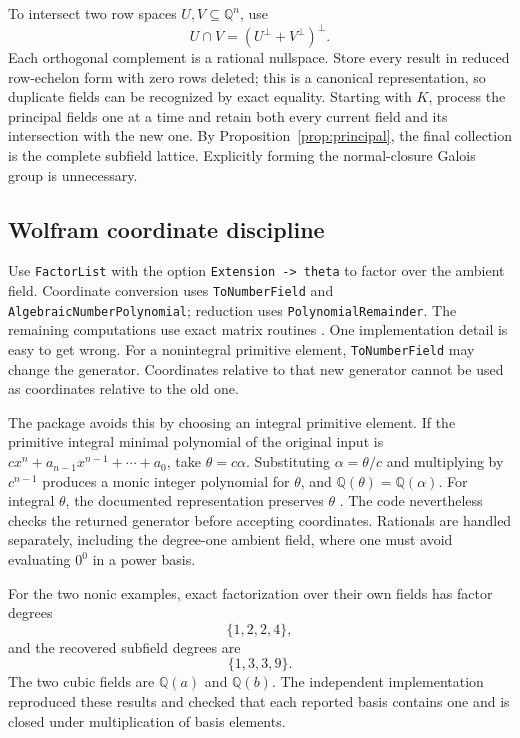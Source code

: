 \documentclass[11pt,letterpaper]{article}
\theoremstyle{definition}
\theoremstyle{remark}
\newcommand{\Q}{\mathbb Q}
\newcommand{\wl}[1]{\texttt{#1}}
\begin{document}
To intersect two row spaces \(U,V\subseteq\Q^n\), use
\begin{equation}
 U\cap V=(U^\perp+V^\perp)^\perp.\label{eq:intersection}
\end{equation}
Each orthogonal complement is a rational nullspace. Store every result in
reduced row-echelon form with zero rows deleted; this is a canonical
representation, so duplicate fields can be recognized by exact equality.
Starting with \(K\), process the principal fields one at a time and retain
both every current field and its intersection with the new one. By
Proposition~\ref{prop:principal}, the final collection is the complete
subfield lattice. Explicitly forming the normal-closure Galois group is
unnecessary.

\subsection{Wolfram coordinate discipline}
Use \wl{FactorList} with the option \wl{Extension -> theta} to factor over
the ambient field. Coordinate conversion uses \wl{ToNumberField} and
\wl{AlgebraicNumberPolynomial}; reduction uses \wl{PolynomialRemainder}.
The remaining computations use exact matrix routines
\cite{factorlist,tonumberfield,anpoly,polyrem,linearsolve}.
One implementation detail is easy to get wrong. For a nonintegral primitive
element, \wl{ToNumberField} may change the generator. Coordinates relative
to that new generator cannot be used as coordinates relative to the old one.

The package avoids this by choosing an integral primitive element. If the
primitive integral minimal polynomial of the original input is
\(cx^n+a_{n-1}x^{n-1}+\cdots+a_0\), take \(\theta=c\alpha\). Substituting
\(\alpha=\theta/c\) and multiplying by \(c^{n-1}\) produces a monic
integer polynomial for \(\theta\), and \(\Q(\theta)=\Q(\alpha)\).
For integral \(\theta\), the documented representation preserves
\(\theta\) \cite{tonumberfield}. The code nevertheless checks the returned
generator before accepting coordinates. Rationals are handled separately,
including the degree-one ambient field, where one must avoid evaluating
\(0^0\) in a power basis.

For the two nonic examples, exact factorization over their own fields has
factor degrees
\[
 \{1,2,2,4\},
\]
and the recovered subfield degrees are
\begin{equation}\{1,3,3,9\}.\label{eq:examplefields}\end{equation}
The two cubic fields are \(\Q(a)\) and \(\Q(b)\). The independent
implementation reproduced these results and checked that each reported
basis contains one and is closed under multiplication of basis elements.
\end{document}
